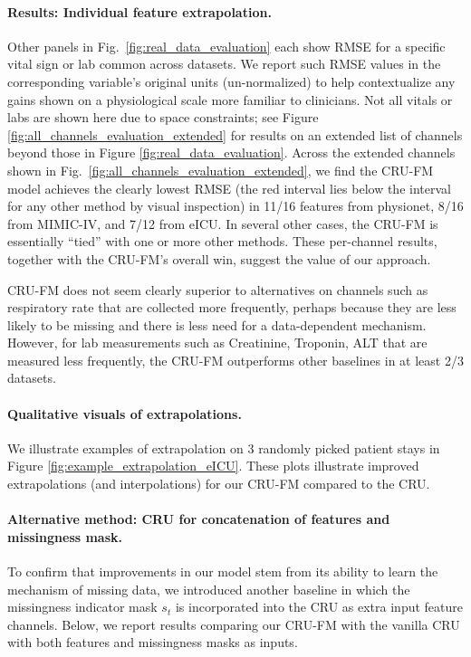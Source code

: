 \paragraph{Results: Individual feature extrapolation.}
Other panels in Fig.~\ref{fig:real_data_evaluation} each show RMSE for a specific vital sign or lab  common across datasets. We report such RMSE values in the corresponding variable's original units (un-normalized) to help contextualize any gains shown on a physiological scale more familiar to clinicians.
Not all vitals or labs are shown here due to space constraints; see Figure \ref{fig:all_channels_evaluation_extended} for results on an extended list of channels beyond those in Figure \ref{fig:real_data_evaluation}.
Across the extended channels shown in Fig.~\ref{fig:all_channels_evaluation_extended}, we find the CRU-FM model achieves the clearly lowest RMSE (the red interval lies below the interval for any other method by visual inspection) in 11/16 features from physionet, 8/16 from MIMIC-IV, and 7/12 from eICU. In several other cases, the CRU-FM is essentially ``tied'' with one or more other methods. These per-channel results, together with the CRU-FM's overall win, suggest the value of our approach.

CRU-FM does not seem clearly superior to alternatives on channels such as respiratory rate that are collected more frequently, perhaps because they are less likely to be missing and there is less need for a data-dependent mechanism. However, for lab measurements such as Creatinine, Troponin, ALT that are measured less frequently, the CRU-FM outperforms other baselines in at least 2/3 datasets. 

\paragraph{Qualitative visuals of extrapolations.} We  illustrate examples of extrapolation on 3 randomly picked patient stays in Figure \ref{fig:example_extrapolation_eICU}.
These plots illustrate improved extrapolations (and interpolations) for our CRU-FM compared to the CRU. 



\paragraph{Alternative method: CRU for concatenation of features and missingness mask.}
To confirm that improvements in our model stem from its ability to learn the mechanism of missing data, we introduced another baseline in which the missingness indicator mask $s_t$ is incorporated into the CRU as extra input feature channels. 
Below, we report results comparing our CRU-FM with the vanilla CRU with both features and missingness masks as inputs.

